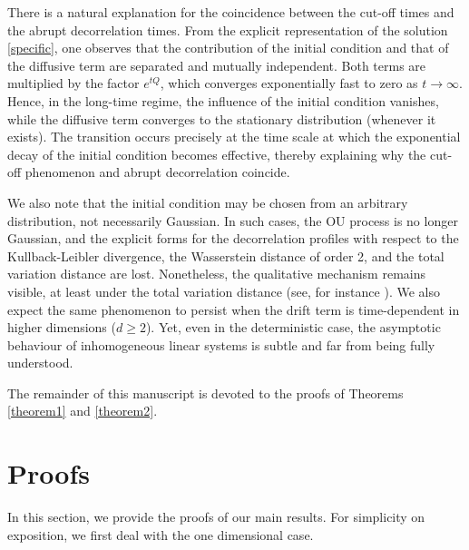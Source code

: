 \documentclass[12pt,thmsa]{article}
\begin{document}
There is a natural explanation for the coincidence between the cut-off times \cite{BJ, BJ1} and the abrupt decorrelation times. From the explicit representation of the solution \eqref{specific}, one observes that the contribution of the initial condition and that of the diffusive term are separated and mutually independent. Both terms are multiplied by the factor $e^{tQ}$, which converges exponentially fast to zero as $t \to \infty$. Hence, in the long-time regime, the influence of the initial condition vanishes, while the diffusive term converges to the stationary distribution (whenever it exists). The transition occurs precisely at the time scale at which the exponential decay of the initial condition becomes effective, thereby explaining why the cut-off phenomenon and abrupt decorrelation coincide.

We also note that the initial condition may be chosen from an arbitrary distribution, not necessarily Gaussian. In such cases, the OU process is no longer Gaussian, and the explicit forms for the decorrelation profiles with respect to the Kullback-Leibler divergence, the Wasserstein distance of order 2, and the total variation distance are lost. Nonetheless, the qualitative mechanism remains visible, at least under the total variation distance (see, for instance \cite{BLPP1}). We also expect the same phenomenon to persist when the drift term is time-dependent in higher dimensions ($d \geq 2$). Yet, even in the deterministic case, the asymptotic behaviour of inhomogeneous linear systems is subtle and far from being fully understood.

The remainder of this   manuscript is devoted to the proofs of Theorems \ref{theorem1} and \ref{theorem2}.

\section{Proofs}
In this section, we provide the proofs of our main results. For simplicity on exposition,  we first deal with the one dimensional case.
\end{document}
